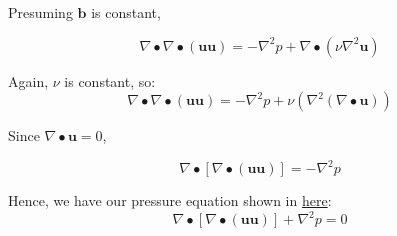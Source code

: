 \documentclass[masters]{ucbthesis}
\renewcommand{\_}{\kern-1.5pt\textunderscore\kern-1.5pt}
\begin{document}
Presuming $\mathbf{b}$ is constant,

\begin{equation*} 
	\nabla \bullet\nabla \bullet (\mathbf{u} \mathbf{u})
	= 
	-\nabla^2 p 
	+\nabla \bullet (\nu \nabla^2 \mathbf{u})
\end{equation*}

Again, $\nu$ is constant, so:
\begin{equation*} 
	\nabla \bullet\nabla \bullet (\mathbf{u} \mathbf{u})
	= 
	-\nabla^2 p 
	+ \nu ( \nabla^2 (\nabla \bullet\mathbf{u}))
\end{equation*}

Since $\nabla \bullet \mathbf{u} = 0$, 

\begin{equation*} 
	\nabla \bullet [\nabla \bullet (\mathbf{u} \mathbf{u})]
	= 
	-\nabla^2 p 
\end{equation*}

Hence, we have our pressure equation shown in 
\href{https://doc.cfd.direct/notes/cfd-general-principles/incompressible-flow}{here}:
\begin{equation*} 
	\nabla \bullet [\nabla \bullet (\mathbf{u} \mathbf{u})]
	+ \nabla^2 p = 0
\end{equation*}

\printbibliography

\end{document}
